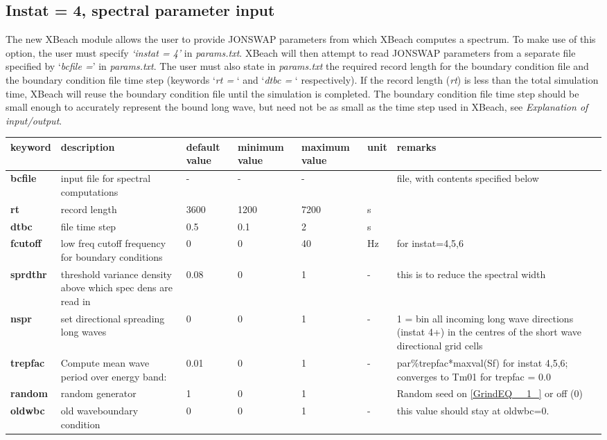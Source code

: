 \subsection{Instat = 4, spectral parameter input}

The new XBeach module allows the user to provide JONSWAP parameters from which XBeach computes a spectrum. To make use of this option, the user must specify \textit{`instat = 4'} in \textit{params.txt}. XBeach will then attempt to read JONSWAP parameters from a separate file specified by `\textit{bcfile =}' in \textit{params.txt}. The user must also state in \textit{params.txt} the required record length for the boundary condition file and the boundary condition file time step (keywords `\textit{rt =} ` and `\textit{dtbc =} ` respectively). If the record length (\textit{rt}) is less than the total simulation time, XBeach will reuse the boundary condition file until the simulation is completed. The boundary condition file time step should be small enough to accurately represent the bound long wave, but need not be as small as the time step used in XBeach, see \textit{Explanation of input/output}.

\begin{tabular}{|p{0.5in}|p{0.7in}|p{0.4in}|p{0.5in}|p{0.5in}|p{0.3in}|p{1.1in}|} \hline 
keyword & description & default value & minimum value & maximum value & unit & remarks \\ \hline 
\textbf{bcfile} & input file for spectral computations & - & - & - &  & file, with contents specified below \\ \hline 
\textbf{rt} & record length & 3600 & 1200 & 7200 & s &  \\ \hline 
\textbf{dtbc} & file time step & 0.5 & 0.1 & 2 & s &  \\ \hline 
\textbf{fcutoff} & low freq cutoff frequency for boundary conditions & 0 & 0 & 40 & Hz & for instat=4,5,6 \\ \hline 
\textbf{sprdthr} & threshold variance density above which spec dens are read in  & 0.08 & 0 & 1 & - & this is to reduce the spectral width \\ \hline 
\textbf{nspr} & set directional spreading long waves & 0 & 0 & 1 & - & 1 = bin all incoming long wave directions (instat 4+) in the centres of the short wave directional grid cells \\ \hline 
\textbf{trepfac} & Compute mean wave period over energy band: & 0.01 & 0 & 1 & - & par\%trepfac*maxval(Sf) for instat 4,5,6; converges to Tm01 for trepfac = 0.0  \\ \hline 
\textbf{random} & random generator & 1 & 0 & 1 &  & Random seed on \eqref{GrindEQ__1_} or off (0) \\ \hline 
\textbf{oldwbc} & old waveboundary condition & 0 & 0 & 1 & - & this value should stay at oldwbc=0. \\ \hline 
\end{tabular}

